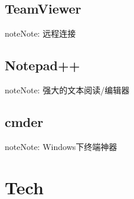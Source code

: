 \documentclass[letterpaper,10pt,english]{sphinxmanual}
\begin{document}
\section{TeamViewer}
\label{\detokenize{softwares/index:teamviewer}}
\begin{sphinxadmonition}{note}{Note:}
远程连接

\end{sphinxadmonition}


\section{Notepad++}
\label{\detokenize{softwares/index:notepad}}
\begin{sphinxadmonition}{note}{Note:}
强大的文本阅读/编辑器

\end{sphinxadmonition}


\section{cmder}
\label{\detokenize{softwares/index:cmder}}
\begin{sphinxadmonition}{note}{Note:}
Windows下终端神器

\end{sphinxadmonition}


\chapter{Tech}
\label{\detokenize{tech/index:tech}}\label{\detokenize{tech/index::doc}}
\end{document}
